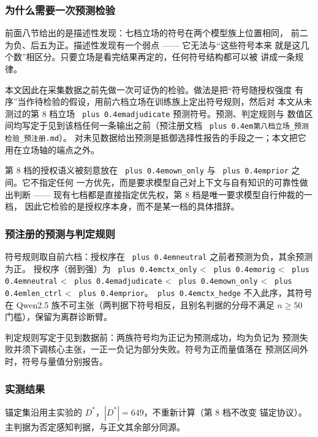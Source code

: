 \documentclass[10.5pt,compsoc,UTF8]{CjC}
\theoremstyle{mystyle}
\DeclareRobustCommand{\code}[1]{\texttt{\spaceskip=0pt plus 0.4em\relax#1}}
\DeclareRobustCommand{\codesplit}[1]{\texttt{\spaceskip=0pt plus 0.4em\relax#1}}
\begin{document}
\subsubsection{为什么需要一次预测检验}
\label{sec:4-9-1}

前面八节给出的是描述性发现：七档立场的符号在两个模型族上位置相同，
前二为负、后五为正。描述性发现有一个弱点 —— 它无法与“这些符号本来
就是这几个数”相区分。只要立场是看完结果再定的，任何符号结构都可以被
讲成一条规律。

本文因此在采集数据之前先做一次可证伪的检验。做法是把“符号随授权强度
有序”当作待检验的假设，用前六档立场在训练族上定出符号规则，然后对
本文从未测过的第 8 档立场 \code{adjudicate} 预测符号。预测、判定规则与
数值区间均写定于见到该档任何一条输出之前（预注册文档
\codesplit{第\allowbreak{}八\allowbreak{}档\allowbreak{}立\allowbreak{}场\allowbreak{}\_预\allowbreak{}测\allowbreak{}检\allowbreak{}验\allowbreak{}\_预\allowbreak{}注\allowbreak{}册\allowbreak{}.\allowbreak{}m\allowbreak{}d\allowbreak{}}）。
对未见数据给出预测是抵御选择性报告的手段之一\cite{ref28,ref40}；本文把它
用在立场轴的端点之外。

第 8 档的授权语义被刻意放在 \code{own\_only} 与 \code{prior} 之间。它不指定任何
一方优先，而是要求模型自己对上下文与自有知识的可靠性做出判断 ——
现有七档都是直接指定优先权，第 8 档是唯一要求模型自行仲裁的一档，
因此它检验的是授权序本身，而不是某一档的具体措辞。

\subsubsection{预注册的预测与判定规则}
\label{sec:4-9-2}

符号规则取自前六档：授权序在 \code{neutral} 之前者预测为负，其余预测为正。
授权序（弱到强）为 \code{ctx\_only} < \code{orig} < \code{neutral} < \code{adjudicate}
< \code{own\_only} < \code{len\_ctrl} < \code{prior}。\code{ctx\_hedge} 不入此序，其符号在
Qwen2.5 族不可主张（两判据下符号相反，且别名判据的分母不满足 $n\geq50$ 门槛），保留为离群诊断臂。

判定规则写定于见到数据前：两族符号均为正记为预测成功，均为负记为
预测失败并须下调核心主张，一正一负记为部分失败。符号为正而量值落在
预测区间外时，符号与量值分别报告。

\subsubsection{实测结果}
\label{sec:4-9-3}

锚定集沿用主实验的 $D^*$，$|D^*|=649$，不重新计算（第 8 档不改变
锚定协议）。主判据为否定感知判据，与正文其余部分同源。
\end{document}
